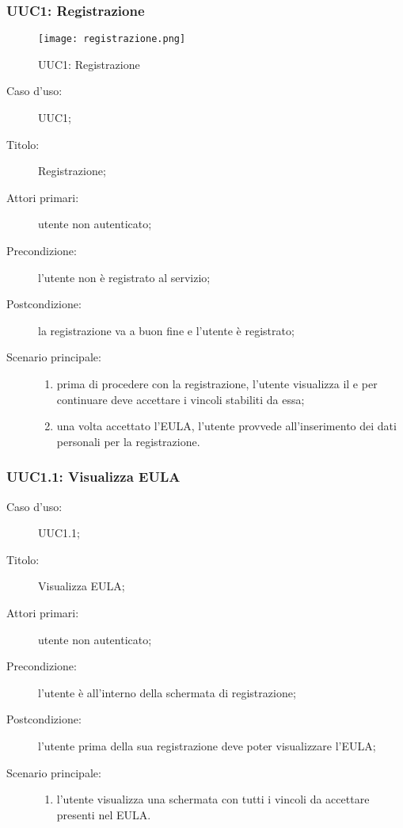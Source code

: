 \documentclass[../../../analisi-dei-requisiti.tex]{subfiles}
\begin{document}
\subsubsection{UUC1: Registrazione}%
\label{subs:UUC1}

\begin{figure}[H]
  \centering
  \texttt{[image: registrazione.png]}
  \caption{UUC1: Registrazione}%
  \label{fig:uuc1}
\end{figure}

\begin{description}
  \item[Caso d'uso:] UUC1;
  \item[Titolo:] Registrazione;
  \item[Attori primari:] utente non autenticato;
  \item[Precondizione:] l'utente non è registrato al servizio;
  \item[Postcondizione:] la registrazione va a buon fine e l'utente è registrato;
  \item[Scenario principale:]
        \begin{enumerate}
          \item prima di procedere con la registrazione, l'utente visualizza il  e per continuare deve accettare i vincoli stabiliti da essa;
          \item una volta accettato l'EULA, l'utente provvede all'inserimento dei dati personali per la registrazione.
        \end{enumerate}
\end{description}


\subsubsection{UUC1.1: Visualizza EULA}%
\label{subs:UUC1.1}
\begin{description}
  \item[Caso d'uso:] UUC1.1;
  \item[Titolo:] Visualizza EULA\@;
  \item[Attori primari:] utente non autenticato;
  \item[Precondizione:] l'utente è all'interno della schermata di registrazione;
  \item[Postcondizione:] l'utente prima della sua registrazione deve poter visualizzare l'EULA\@;
  \item[Scenario principale:]
        \begin{enumerate}
          \item l'utente visualizza una schermata con tutti i vincoli da accettare presenti nel EULA\@.
        \end{enumerate}
\end{description}
\end{document}
